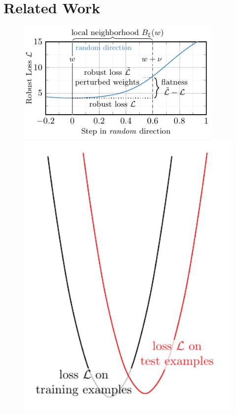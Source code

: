 \section{Related Work}
\label{sec:related-work}

\begin{figure}[t]
	\centering
	\vspace*{-0.3cm}
	\hspace*{-0.4cm}
	\begin{minipage}[t]{0.3\textwidth}
		\includegraphics[width=0.9\textwidth]{fig_main_illustration3}
	\end{minipage}
	\begin{minipage}[t]{0.12\textwidth}
		\includegraphics[width=1.2\textwidth]{fig_main_illustration2} 

\end{minipage}
\end{figure}
